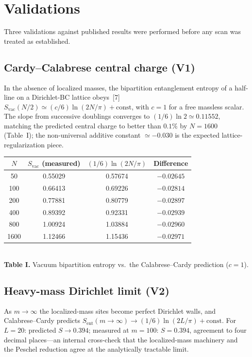 \documentclass[11pt]{article}
\newcommand{\Sent}{S_{\mathrm{ent}}}
\newcommand{\Svac}{S_{\mathrm{vac}}}
\begin{document}
\section{Validations}
Three validations against published results were performed before any scan was treated as established.

\subsection{Cardy--Calabrese central charge (V1)}
In the absence of localized masses, the bipartition entanglement entropy of a half-line on a
Dirichlet-BC lattice obeys~[7] $\Svac(N/2) \simeq (c/6)\ln(2N/\pi) + \mathrm{const}$, with $c=1$ for a
free massless scalar. The slope from successive doublings converges to
$(1/6)\ln 2 \simeq 0.11552$, matching the predicted central charge to better than $0.1\%$ by $N=1600$
(Table~I); the non-universal additive constant $\simeq -0.030$ is the expected
lattice-regularization piece.
\begin{center}
\begin{tabular}{cccc}
\toprule
$N$ & $\Svac$ (measured) & $(1/6)\ln(2N/\pi)$ & Difference \\
\midrule
50   & 0.55029 & 0.57674 & $-0.02645$ \\
100  & 0.66413 & 0.69226 & $-0.02814$ \\
200  & 0.77881 & 0.80779 & $-0.02897$ \\
400  & 0.89392 & 0.92331 & $-0.02939$ \\
800  & 1.00924 & 1.03884 & $-0.02960$ \\
1600 & 1.12466 & 1.15436 & $-0.02971$ \\
\bottomrule
\end{tabular}
\\[2pt]
{\small \textbf{Table I.} Vacuum bipartition entropy vs.\ the Calabrese--Cardy prediction ($c=1$).}
\end{center}

\subsection{Heavy-mass Dirichlet limit (V2)}
As $m\to\infty$ the localized-mass sites become perfect Dirichlet walls, and Calabrese--Cardy predicts
$\Sent(m\to\infty) \to (1/6)\ln(2L/\pi) + \mathrm{const}$. For $L=20$: predicted $S \to 0.394$; measured
at $m=100$: $S = 0.394$, agreement to four decimal places---an internal cross-check that the
localized-mass machinery and the Peschel reduction agree at the analytically tractable limit.
\end{document}
